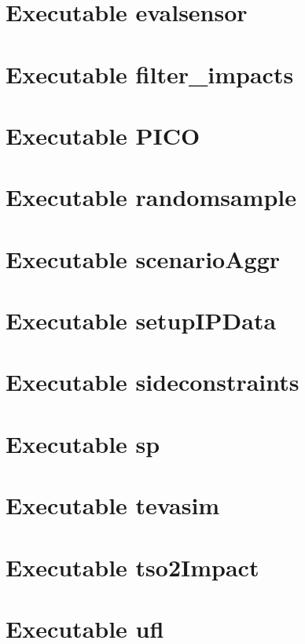 \chapter{Executable evalsensor}\label{evalsensorExecutable}

\newpage
\chapter{Executable filter\_impacts}\label{filter_impactsExecutable}

\newpage
\chapter{Executable PICO}\label{picoExecutable}

\newpage
\chapter{Executable randomsample}\label{randomsampleExecutable}

\newpage
\chapter{Executable scenarioAggr}\label{scenarioAggrExecutable}

\newpage
\chapter{Executable setupIPData}\label{setupIPDataExecutable}

\newpage
\chapter{Executable sideconstraints}\label{sideconstraintsExecutable}

\newpage
\chapter{Executable sp}\label{spExecutable}

\newpage
\chapter{Executable tevasim}\label{tevasimExecutable}

\newpage
\chapter{Executable tso2Impact}\label{tso2ImpactExecutable}

\newpage
\chapter{Executable ufl}\label{lagrangianExecutable}

